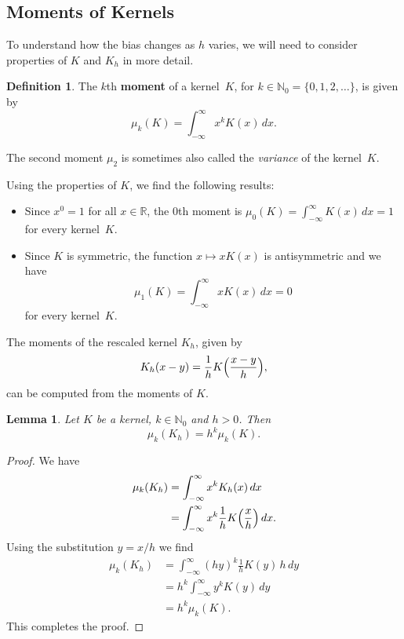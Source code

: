 \documentclass[
  a4paper,
]{article}
\newtheorem{lemma}{Lemma}[section]
\theoremstyle{definition}
\newtheorem{definition}{Definition}[section]
\theoremstyle{definition}
\theoremstyle{definition}
\theoremstyle{definition}
\theoremstyle{remark}
\begin{document}
\hypertarget{moments-of-kernels}{%
\subsection{Moments of Kernels}\label{moments-of-kernels}}

To understand how the bias changes as \(h\) varies, we will need to
consider properties of \(K\) and \(K_h\) in more detail.

\begin{definition}
The \(k\)th \textbf{moment} of a kernel~\(K\),
for \(k \in \mathbb{N}_0 = \{0, 1, 2, \ldots\}\), is given by
\begin{equation*}
  \mu_k(K)
  = \int_{-\infty}^\infty x^k K(x) \,dx.
\end{equation*}
\end{definition}

The second moment \(\mu_2\) is sometimes also called the \emph{variance}
of the kernel~\(K\).

Using the properties of \(K\), we find the following results:

\begin{itemize}
\item
  Since \(x^0 = 1\) for all \(x\in\mathbb{R}\),
  the \(0\)th moment is \(\mu_0(K) = \int_{-\infty}^\infty K(x) \,dx = 1\)
  for every kernel~\(K\).
\item
  Since \(K\) is symmetric, the function \(x \mapsto x K(x)\) is
  antisymmetric and we have
  \begin{equation*}
    \mu_1(K)
    = \int_{-\infty}^\infty x K(x) \,dx
    = 0
  \end{equation*}
  for every kernel~\(K\).
\end{itemize}

The moments of the rescaled kernel \(K_h\), given by
\begin{equation*}
    K_h(x - y)
    = \frac{1}{h} K\Bigl( \frac{x-y}{h} \Bigr),
\end{equation*}
can be computed from the moments of \(K\).

\begin{lemma}
\protect\hypertarget{lem:Kh-scal}{}\label{lem:Kh-scal}Let \(K\) be a kernel, \(k \in \mathbb{N}_0\) and \(h > 0\). Then
\begin{equation*}
  \mu_k(K_h)
  = h^k \mu_k(K).
\end{equation*}
\end{lemma}

\begin{proof}
We have
\begin{align*}
  \mu_k(K_h)
  &= \int_{-\infty}^\infty x^k K_h(x) \,dx \\
  &= \int_{-\infty}^\infty x^k \frac1h K\Bigl(\frac{x}{h}\Bigr) \,dx.
\end{align*}
Using the substitution \(y = x/h\) we find
\begin{align*}
  \mu_k(K_h)
  &= \int_{-\infty}^\infty (hy)^k \frac1h K(y) \, h \,dy \\
  &= h^k \int_{-\infty}^\infty y^k K(y) \,dy \\
  &= h^k \mu_k(K).
\end{align*}
This completes the proof.
\end{proof}
\end{document}
